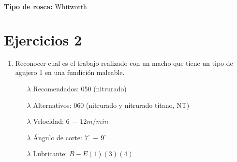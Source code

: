 \documentclass[a4paper,12pt]{article}
\begin{document}
\textbf{Tipo de rosca:} Whitworth

\section{Ejercicios 2}

\begin{enumerate}
    \item Reconocer cual es el trabajo realizado con un macho que tiene un tipo de agujero 1 en una fundición maleable.
           \begin{itemize}
            \item[$\lambda$] Recomendados: 050 (nitrurado)
            \item[$\lambda$] Alternativos: 060 (nitrurado y nitrurado titano, NT)
            \item[$\lambda$] Velocidad: $6 \,-\, 12 m/min$
            \item[$\lambda$] Ángulo de corte: $7^{\circ} \, - \, 9^{\circ}$
            \item[$\lambda$] Lubricante: $B-E(1)(3)(4)$
        \end{itemize}
            
            

\end{enumerate}
\end{document}
